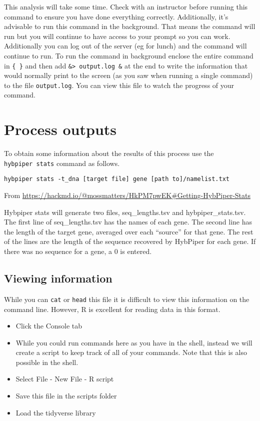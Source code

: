 \documentclass[
]{book}
\providecommand{\tightlist}{%
  \setlength{\itemsep}{0pt}\setlength{\parskip}{0pt}}
\begin{document}
This analysis will take some time. Check with an instructor before running this command to ensure you have done everything correctly.
Additionally, it's advisable to run this command in the background.
That means the command will run but you will continue to have access to your prompt so you can work.
Additionally you can log out of the server (eg for lunch) and the command will continue to run.
To run the command in background enclose the entire command in \texttt{\{\ \}}
and then add \texttt{\&\textgreater{}\ output.log\ \&} at the end to write the information that would normally print to the screen (as you saw when running a single command) to the file \texttt{output.log}.
You can view this file to watch the progress of your command.

\hypertarget{process-outputs}{%
\section{Process outputs}\label{process-outputs}}

To obtain some information about the results of this process use the \texttt{hybpiper\ stats} command as follows.

\begin{verbatim}
hybpiper stats -t_dna [target file] gene [path to]/namelist.txt
\end{verbatim}

From \url{https://hackmd.io/@mossmatters/HkPM7pwEK\#Getting-HybPiper-Stats}

Hybpiper stats will generate two files, seq\_lengths.tsv and hybpiper\_stats.tsv.
The first line of seq\_lengths.tsv has the names of each gene.
The second line has the length of the target gene, averaged over each ``source'' for that gene.
The rest of the lines are the length of the sequence recovered by HybPiper for each gene. If there was no sequence for a gene, a 0 is entered.

\hypertarget{viewing-information}{%
\subsection{Viewing information}\label{viewing-information}}

While you can \texttt{cat} or \texttt{head} this file it is difficult to view this information on the command line.
However, R is excellent for reading data in this format.

\begin{itemize}
\tightlist
\item
  Click the Console tab
\item
  While you could run commands here as you have in the shell, instead we will create a script to keep track of all of your commands. Note that this is also possible in the shell.
\item
  Select File - New File - R script
\item
  Save this file in the scripts folder
\item
  Load the tidyverse library
\end{itemize}
\end{document}

